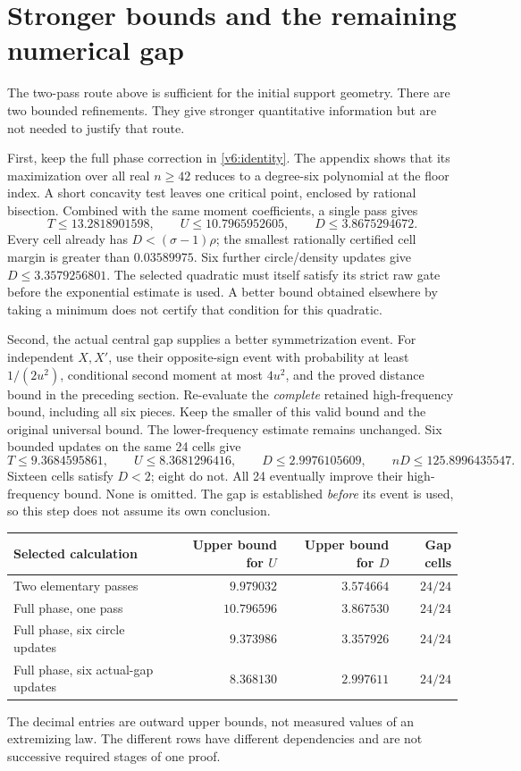 \section{Stronger bounds and the remaining numerical gap}

The two-pass route above is sufficient for the initial support geometry.
There are two bounded refinements. They give stronger quantitative
information but are not needed to justify that route.

First, keep the full phase correction in \eqref{v6:identity}. The
appendix shows that its maximization over all real $n\ge42$ reduces to
a degree-six polynomial at the floor index. A short concavity test
leaves one critical point, enclosed by rational bisection. Combined with
the same moment coefficients, a single pass gives
\[
 T\le13.2818901598,\qquad U\le10.7965952605,\qquad
 D\le3.8675294672.
\]
Every cell already has $D<(\sigma-1)\rho$; the smallest rationally
certified cell margin is greater than $0.03589975$.
Six further circle/density updates give $D\le3.3579256801$.
The selected quadratic must itself satisfy its strict raw gate before
the exponential estimate is used. A better bound obtained elsewhere by
taking a minimum does not certify that condition for this quadratic.

Second, the actual central gap supplies a better symmetrization event.
For independent $X,X'$, use their opposite-sign event with probability
at least $1/(2u^2)$, conditional second moment at most $4u^2$, and the
proved distance bound in the preceding section. Re-evaluate the
\emph{complete} retained high-frequency bound, including all six pieces.
Keep the smaller of this valid bound and the original universal bound.
The lower-frequency estimate remains unchanged. Six bounded updates on
the same 24 cells give
\[
 T\le9.3684595861,\qquad U\le8.3681296416,\qquad
 D\le2.9976105609,\qquad nD\le125.8996435547.
\]
Sixteen cells satisfy $D<2$; eight do not. All 24 eventually improve
their high-frequency bound. None is omitted. The gap is established
\emph{before} its event is used, so this step does not assume its own
conclusion.

\begin{center}
\begin{tabular}{@{}lrrr@{}}
\toprule
Selected calculation & Upper bound for $U$ & Upper bound for $D$ & Gap cells\\
\midrule
Two elementary passes & $9.979032$ & $3.574664$ & $24/24$\\
Full phase, one pass & $10.796596$ & $3.867530$ & $24/24$\\
Full phase, six circle updates & $9.373986$ & $3.357926$ & $24/24$\\
Full phase, six actual-gap updates & $8.368130$ & $2.997611$ & $24/24$\\
\bottomrule
\end{tabular}
\end{center}
The decimal entries are outward upper bounds, not measured values of an
extremizing law. The different rows have different dependencies and are
not successive required stages of one proof.

